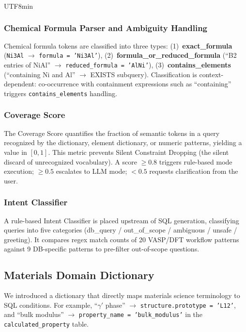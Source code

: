\documentclass[sn-mathphys,Numbered]{sn-jnl}
\begin{document}
\begin{CJK}{UTF8}{min}
\subsubsection{Chemical Formula Parser and Ambiguity Handling}

Chemical formula tokens are classified into three types:
(1)~\textbf{exact\_formula} (\texttt{Ni3Al} $\to$ \texttt{formula = 'Ni3Al'}),
(2)~\textbf{formula\_or\_reduced\_formula} (``B2 entries of NiAl'' $\to$
\texttt{reduced\_formula = 'AlNi'}),
(3)~\textbf{contains\_elements} (``containing Ni and Al'' $\to$ EXISTS subquery).
Classification is context-dependent: co-occurrence with containment
expressions such as ``containing'' triggers
\texttt{contains\_elements} handling.

\subsubsection{Coverage Score}
\label{sec:coverage_score}

The Coverage Score quantifies the fraction of semantic tokens in a query
recognized by the dictionary, element dictionary, or numeric patterns,
yielding a value in $[0, 1]$.
This metric prevents Silent Constraint Dropping (the silent discard of
unrecognized vocabulary).
A score $\geq 0.8$ triggers rule-based mode execution;
$\geq 0.5$ escalates to LLM mode;
$< 0.5$ requests clarification from the user.

\subsubsection{Intent Classifier}
\label{sec:intent_classifier}

A rule-based Intent Classifier is placed upstream of SQL generation,
classifying queries into five categories
(db\_query / out\_of\_scope / ambiguous / unsafe / greeting).
It compares regex match counts of 20 VASP/DFT workflow patterns
against 9 DB-specific patterns to pre-filter out-of-scope questions.

\subsection{Materials Domain Dictionary}
\label{sec:domain_dict}

We introduced a dictionary that directly maps materials science
terminology to SQL conditions.
For example, ``$\gamma'$ phase'' $\to$ \texttt{structure.prototype = 'L12'},
and ``bulk modulus'' $\to$
\texttt{property\_name = 'bulk\_modulus'} in the
\texttt{calculated\_property} table.


\end{CJK}
\end{document}
